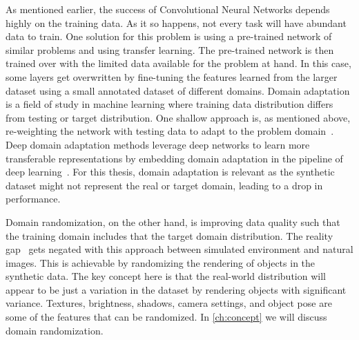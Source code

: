 As mentioned earlier, the success of Convolutional Neural Networks depends highly on the training data.
As it so happens, not every task will have abundant data to train.
One solution for this problem is using a pre-trained network of similar problems and using transfer learning.
The pre-trained network is then trained over with the limited data available for the problem at hand.
In this case, some layers get overwritten by fine-tuning the features learned from the larger dataset using a small annotated dataset of different domains.
Domain adaptation is a field of study in machine learning where training data distribution differs from testing or target distribution.
One shallow approach is, as mentioned above,
re-weighting the network with testing data to adapt to the problem domain~\cite{Li2017PredictionRF}.
\”Deep domain adaptation methods leverage deep networks to learn more transferable representations by embedding domain adaptation in the pipeline of
deep learning\”~\cite{DBLP:journals/corr/abs-1802-03601}.
For this thesis, domain adaptation is relevant as the synthetic dataset might not represent the real or target domain, leading to a drop in performance.

Domain randomization, on the other hand, is improving data quality such that the training domain includes that the target domain distribution.
The \’reality gap\’~\cite{tobin2017domain} gets negated with this approach between simulated environment and natural images.
This is achievable by randomizing the rendering of objects in the synthetic data.
The key concept here is that the real-world distribution will appear to be just a variation in the dataset by rendering objects with significant variance.
Textures, brightness, shadows, camera settings, and object pose are some of the features that can be randomized.
In \autoref{ch:concept} we will discuss domain randomization.


